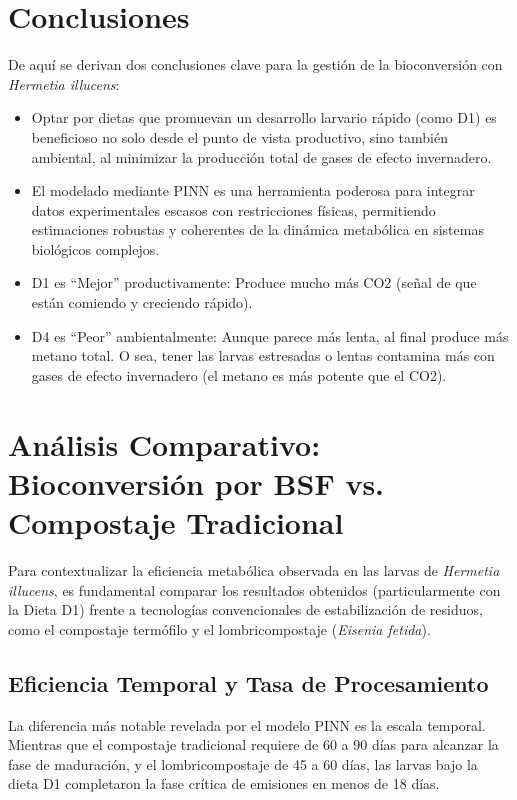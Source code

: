 \section{Conclusiones}
De aquí se derivan dos conclusiones clave para la gestión de la bioconversión con \textit{Hermetia illucens}:
\begin{itemize}
    \item Optar por dietas que promuevan un desarrollo larvario rápido (como D1) es beneficioso no solo desde el punto de vista productivo, sino también ambiental, al minimizar la producción total de gases de efecto invernadero.
    \item El modelado mediante PINN es una herramienta poderosa para integrar datos experimentales escasos con restricciones físicas, permitiendo estimaciones robustas y coherentes de la dinámica metabólica en sistemas biológicos complejos.
    \item D1 es ``Mejor'' productivamente: Produce mucho más CO2 (señal de que están comiendo y creciendo rápido).

    \item D4 es ``Peor'' ambientalmente: Aunque parece más lenta, al final produce más metano total. O sea, tener las larvas estresadas o lentas contamina más con gases de efecto invernadero (el metano es más potente que el CO2).
\end{itemize}

\section{Análisis Comparativo: Bioconversión por BSF vs. Compostaje Tradicional}

Para contextualizar la eficiencia metabólica observada en las larvas de \textit{Hermetia illucens}, es fundamental comparar los resultados obtenidos (particularmente con la Dieta D1) frente a tecnologías convencionales de estabilización de residuos, como el compostaje termófilo y el lombricompostaje (\textit{Eisenia fetida}).

\subsection{Eficiencia Temporal y Tasa de Procesamiento}

La diferencia más notable revelada por el modelo PINN es la escala temporal. Mientras que el compostaje tradicional requiere de 60 a 90 días para alcanzar la fase de maduración, y el lombricompostaje de 45 a 60 días, las larvas bajo la dieta D1 completaron la fase crítica de emisiones en menos de 18 días.

